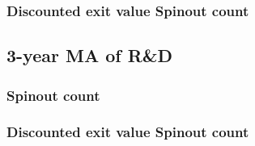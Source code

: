\documentclass[12pt,english]{article}
\theoremstyle{remark}
\begin{document}
\subsubsection{Discounted exit value Spinout count}

\linebreak

\linebreak


\subsection{3-year MA of R\&D}

\subsubsection{Spinout count}


\linebreak

\linebreak



\subsubsection{Discounted exit value Spinout count}


\linebreak

\linebreak

\end{document}
